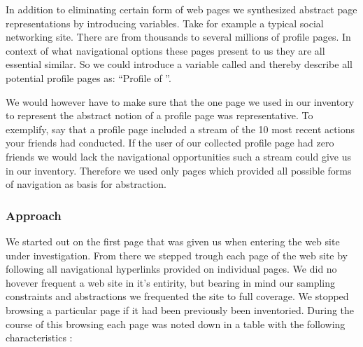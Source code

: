 In addition to eliminating certain form of web pages we synthesized abstract
page representations by introducing variables. Take for example a typical
social networking site. There are from thousands to several millions of
profile pages. In context of what navigational options these pages present to
us they are all essential similar. So we could introduce a variable called
%
and thereby describe all potential profile pages as: ``Profile
of ''.

We would however have to make sure that the one page we used in our inventory
to represent the abstract notion of a profile page was representative. To
exemplify, say that a profile page included a stream of the 10 most recent
actions your friends had conducted. If the user of our collected profile page
had zero friends we would lack the navigational opportunities such a stream
could give us in our inventory. Therefore we used only pages which provided
all possible forms of navigation as basis for abstraction.

\subsubsection{Approach}

We started out on the first page that was given us when entering the web site
under investigation. From there we stepped trough each page of the web site
by following all navigational hyperlinks provided on individual pages.
We did no hovever frequent a web site in it's entirity, but bearing in mind
our sampling constraints and abstractions we frequented the site to full
coverage. We stopped browsing a particular page if it%
had been previously been inventoried. During the course of this browsing
each page was noted down in a table with the following characteristics%
:

